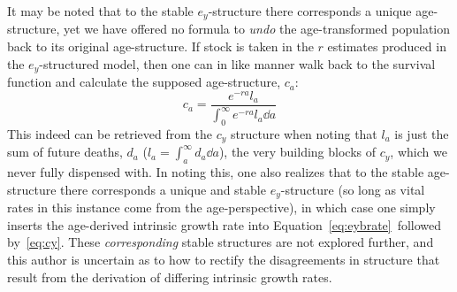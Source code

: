 It may be noted that to the stable $e_y$-structure there corresponds a unique
age-structure, yet we have offered no formula to \textit{undo} the
age-transformed population back to its original age-structure. If stock 
is taken in the $r$ estimates produced in the $e_y$-structured model, 
then one can in like manner walk back to the
survival function and calculate the supposed age-structure, $c_a$:
\begin{equation}
c_a = \frac{e^{-ra}l_a}{\int _0 ^\infty e^{-ra}l_a \dd a}
\end{equation}
This indeed can be retrieved from the $c_y$ structure when noting that $l_a$ is
just the sum of future deaths, $d_a$ ($l_a = \int _a ^\infty d_a \dd a$), the
very building blocks of $c_y$, which we never fully dispensed with. In noting
this, one also realizes that to the stable age-structure there corresponds a
unique and stable $e_y$-structure (so long as vital rates in this instance come
from the age-perspective), in which case one simply inserts the age-derived intrinsic
growth rate into Equation~\eqref{eq:eybrate}~followed by~\eqref{eq:cy}. These
\textit{corresponding} stable structures are not explored further, and this
author is uncertain as to how to rectify the disagreements in structure that
result from the derivation of differing intrinsic growth rates.

 \FloatBarrier
